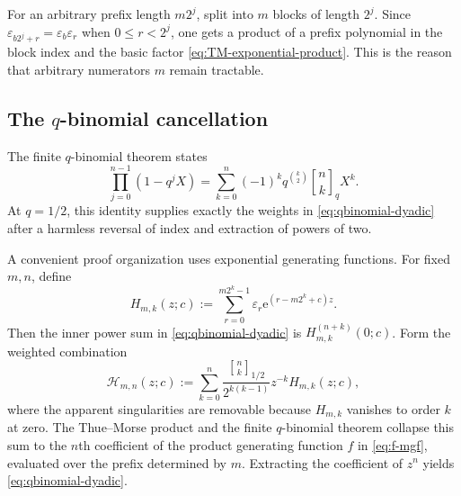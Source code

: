 \documentclass[11pt]{article}
\numberwithin{equation}{section}
\theoremstyle{definition}
\theoremstyle{remark}
\newcommand{\eps}{\varepsilon}
\newcommand{\e}{\mathrm e}
\newcommand{\GaussBinom}[3]{\genfrac{[}{]}{0pt}{}{#1}{#2}_{#3}}
\begin{document}
For an arbitrary prefix length $m2^j$, split into $m$ blocks of length $2^j$.  Since $\eps_{b2^j+r}=\eps_b\eps_r$ when $0\le r<2^j$, one gets a product of a prefix polynomial in the block index and the basic factor \eqref{eq:TM-exponential-product}.  This is the reason that arbitrary numerators $m$ remain tractable.

\subsection{The $q$-binomial cancellation}

The finite $q$-binomial theorem states
\begin{equation}\label{eq:finite-q-binomial}
 \prod_{j=0}^{n-1}(1-q^jX)
 =\sum_{k=0}^{n}(-1)^k q^{\binom k2}
   \GaussBinom{n}{k}{q}X^k.
\end{equation}
At $q=1/2$, this identity supplies exactly the weights in \eqref{eq:qbinomial-dyadic} after a harmless reversal of index and extraction of powers of two.

A convenient proof organization uses exponential generating functions.  For fixed $m,n$, define
\begin{equation}\label{eq:prefix-exp}
 H_{m,k}(z;c):=
 \sum_{r=0}^{m2^k-1}\eps_r\e^{(r-m2^k+c)z}.
\end{equation}
Then the inner power sum in \eqref{eq:qbinomial-dyadic} is $H_{m,k}^{(n+k)}(0;c)$.  Form the weighted combination
\begin{equation}\label{eq:weighted-H}
 \mathcal H_{m,n}(z;c):=
 \sum_{k=0}^{n}
 \frac{\GaussBinom{n}{k}{1/2}}{2^{k(k-1)}}
 z^{-k}H_{m,k}(z;c),
\end{equation}
where the apparent singularities are removable because $H_{m,k}$ vanishes to order $k$ at zero.  The Thue--Morse product and the finite $q$-binomial theorem collapse this sum to the $n$th coefficient of the product generating function $f$ in \eqref{eq:f-mgf}, evaluated over the prefix determined by $m$.  Extracting the coefficient of $z^n$ yields \eqref{eq:qbinomial-dyadic}.
\end{document}
